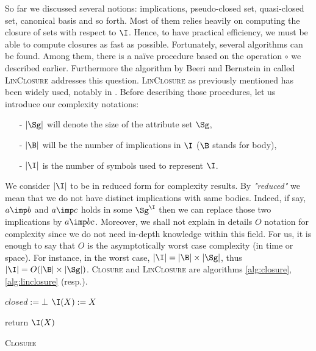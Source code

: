 \vspace{1.2em}

So far we discussed several notions: implications, pseudo-closed set, 
quasi-closed set, canonical basis and so forth. Most of them relies heavily on
computing the closure of sets with respect to $\I$. Hence, to have practical 
efficiency, we must be able to compute closures as fast as possible. 
Fortunately, several algorithms can be found. Among them, there is a naïve
procedure based on the operation $\circ$ we described earlier. Furthermore the 
algorithm by Beeri and Bernstein in \cite{beeri_computational_1979} called 
\textsc{LinClosure} addresses this question. \textsc{LinClosure} as previously 
mentioned has been widely used, notably in \cite{maier_theory_1983, 
david_minimum_1980, b._ganter_conceptual_2016, shock_computing_1986, 
day_lattice_1992}. Before describing those procedures, let us introduce our 
complexity notations:
\begin{itemize}
	\item[-] $|\Sg|$ will denote the size of the attribute set $\Sg$,
	\item[-] $|\B|$ will be the number of implications in $\I$ ($\B$ stands
	for body),
	\item[-] $|\I|$ is the number of symbols used to represent $\I$.
\end{itemize}
We consider $|\I|$ to be in reduced form for complexity results. By \textit{"reduced"} we mean that we do not have distinct implications with same bodies. Indeed, if say, $a \imp b$ and $a \imp c$ holds in some $\Sg^{\I}$ then we can replace those two implications by $a \imp bc$. Moreover, we shall not explain in details $O$ notation for complexity since we do not need in-depth knowledge within this field. For us, it is enough to say that $O$ is the 
asymptotically worst case complexity (in time or space). For instance, in the 
worst case, $|\I| = |\B|\times|\Sg|$, thus $|\I| = O(|\B|\times|\Sg|)$. 
\textsc{Closure} and \textsc{LinClosure} are algorithms \ref{alg:closure}, 
\ref{alg:linclosure} (resp.). 

\vspace{1.2em}

\begin{algorithm}[ht]

\BlankLine
\BlankLine

$closed := \bot$ \;
$\I(X) := X$ \;

\BlankLine

return $\I(X)$\;

\caption{\textsc{Closure}}
\label{alg:closure}
\end{algorithm}



